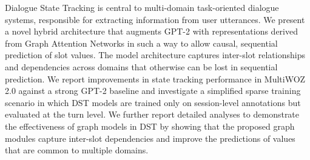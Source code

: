 Dialogue State Tracking is central to multi-domain task-oriented dialogue systems, responsible for extracting information from user utterances. We present a novel hybrid architecture that augments GPT-2 with representations derived from Graph Attention Networks in such a way to allow causal, sequential prediction of slot values. The model architecture captures inter-slot relationships and dependencies across domains that otherwise can be lost in sequential prediction. We report improvements in state tracking performance in MultiWOZ 2.0 against a strong GPT-2 baseline and investigate a simplified sparse training scenario in which DST models are trained only on session-level annotations but evaluated at the turn level. We further report detailed analyses to demonstrate the effectiveness of graph models in DST by showing that the proposed graph modules capture inter-slot dependencies and improve the predictions of values that are common to multiple domains.
